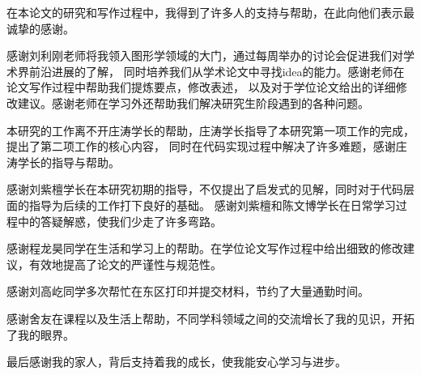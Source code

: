 
\begin{acknowledgements}

在本论文的研究和写作过程中，我得到了许多人的支持与帮助，在此向他们表示最诚挚的感谢。

感谢刘利刚老师将我领入图形学领域的大门，通过每周举办的讨论会促进我们对学术界前沿进展的了解，
同时培养我们从学术论文中寻找idea的能力。感谢老师在论文写作过程中帮助我们提炼要点，修改表述，
以及对于学位论文给出的详细修改建议。感谢老师在学习外还帮助我们解决研究生阶段遇到的各种问题。

本研究的工作离不开庄涛学长的帮助，庄涛学长指导了本研究第一项工作的完成，提出了第二项工作的核心内容，
同时在代码实现过程中解决了许多难题，感谢庄涛学长的指导与帮助。

感谢刘紫檀学长在本研究初期的指导，不仅提出了启发式的见解，同时对于代码层面的指导为后续的工作打下良好的基础。
感谢刘紫檀和陈文博学长在日常学习过程中的答疑解惑，使我们少走了许多弯路。

感谢程龙昊同学在生活和学习上的帮助。在学位论文写作过程中给出细致的修改建议，有效地提高了论文的严谨性与规范性。

感谢刘高屹同学多次帮忙在东区打印并提交材料，节约了大量通勤时间。

感谢舍友在课程以及生活上帮助，不同学科领域之间的交流增长了我的见识，开拓了我的眼界。

最后感谢我的家人，背后支持着我的成长，使我能安心学习与进步。

\end{acknowledgements}
